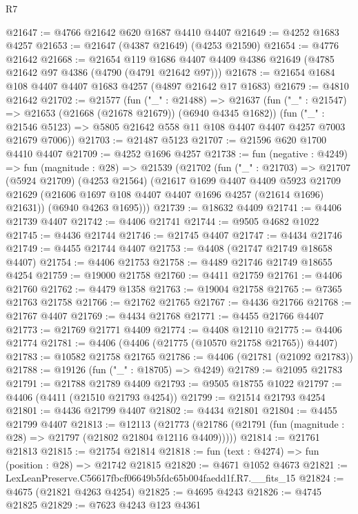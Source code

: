 \begin{lexlean}{R7}
\begin{coremodule}
@21647 := @4766 @21642 @620 @1687 @4410 @4407
@21649 := @4252 @1683 @4257
@21653 := @21647 (@4387 @21649) (@4253 @21590)
@21654 := @4776 @21642
@21668 := @21654
    @119
    @1686
    @4407
    @4409
    @4386
    @21649
    (@4785 @21642 @97 @4386 (@4790 (@4791 @21642 @97)))
@21678 := @21654 @1684 @108 @4407 @4407 @1683 @4257 (@4897 @21642 @17 @1683)
@21679 := @4810 @21642
@21702 := @21577
    (fun ("_" : @21488) =>
    @21637
      (fun ("_" : @21547) => @21653 (@21668 (@21678 @21679)) (@6940 @4345 @1682))
      (fun ("_" : @21546 @5123) => @5805 @21642 @558 @11 @108 @4407 @4407 @4257 @7003 @21679 @7006))
@21703 := @21487 @5123
@21707 := @21596 @620 @1700 @4410 @4407
@21709 := @4252 @1696 @4257
@21738 := fun (negative : @4249) =>
  fun (magnitude : @28) =>
  @21539
    (@21702
      (fun ("_" : @21703) =>
      @21707
        (@5924 @21709)
        (@4253 @21564)
        (@21617
          @1699
          @4407
          @4409
          @5923
          @21709
          @21629
          (@21606 @1697 @108 @4407 @4407 @1696 @4257 (@21614 @1696) @21631))
        (@6940 @4263 @1695)))
@21739 := @18632 @4409
@21741 := @4406 @21739 @4407
@21742 := @4406 @21741
@21744 := @9505 @4682 @1022
@21745 := @4436 @21744
@21746 := @21745 @4407
@21747 := @4434 @21746
@21749 := @4455 @21744 @4407
@21753 := @4408 (@21747 @21749 @18658 @4407)
@21754 := @4406 @21753
@21758 := @4489 @21746 @21749 @18655 @4254
@21759 := @19000 @21758
@21760 := @4411 @21759
@21761 := @4406 @21760
@21762 := @4479 @1358
@21763 := @19004 @21758
@21765 := @7365 @21763 @21758
@21766 := @21762 @21765
@21767 := @4436 @21766
@21768 := @21767 @4407
@21769 := @4434 @21768
@21771 := @4455 @21766 @4407
@21773 := @21769 @21771 @4409
@21774 := @4408 @12110
@21775 := @4406 @21774
@21781 := @4406 (@4406 (@21775 (@10570 @21758 @21765)) @4407)
@21783 := @10582 @21758 @21765
@21786 := @4406 (@21781 (@21092 @21783))
@21788 := @19126 (fun ("_" : @18705) => @4249)
@21789 := @21095 @21783
@21791 := @21788 @21789 @4409
@21793 := @9505 @18755 @1022
@21797 := @4406 (@4411 (@21510 @21793 @4254))
@21799 := @21514 @21793 @4254
@21801 := @4436 @21799 @4407
@21802 := @4434 @21801
@21804 := @4455 @21799 @4407
@21813 := @12113
    (@21773 (@21786 (@21791 (fun (magnitude : @28) => @21797 (@21802 @21804 @12116 @4409)))))
@21814 := @21761 @21813
@21815 := @21754 @21814
@21818 := fun (text : @4274) => fun (position : @28) => @21742 @21815
@21820 := @4671 @1052 @4673
@21821 := LexLeanPreserve.C56617fbcf06649b5fdc65b004faedd1f.R7.__fits_15
@21824 := @4675 (@21821 @4263 @4254)
@21825 := @4695 @4243
@21826 := @4745 @21825
@21829 := @7623 @4243 @123 @4361

\end{coremodule}
\end{lexlean}
